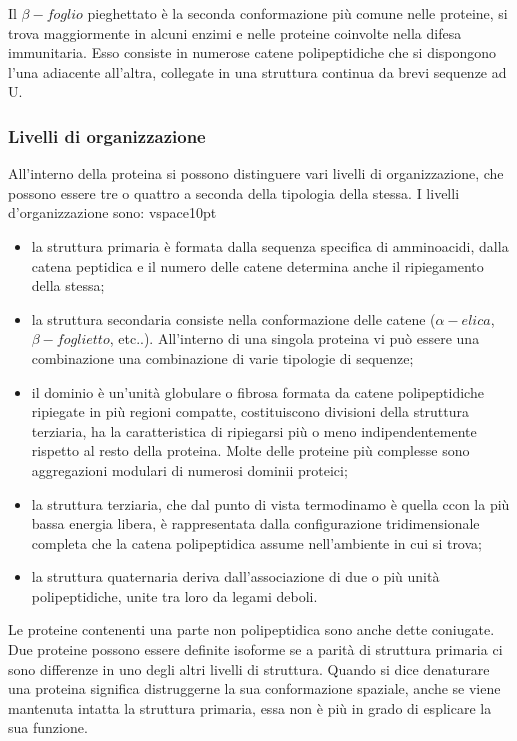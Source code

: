 Il $\beta-foglio$ pieghettato è la seconda conformazione più comune nelle proteine, si trova maggiormente in alcuni enzimi e nelle proteine coinvolte nella difesa 
immunitaria. Esso consiste in numerose catene polipeptidiche che si dispongono l'una adiacente all'altra, collegate in una struttura continua da brevi sequenze ad U.

\subsubsection{Livelli di organizzazione}\label{subsec:es_subsec}
All'interno della proteina si possono distinguere vari livelli di organizzazione, che possono essere tre o quattro a seconda della tipologia della stessa.
I livelli d'organizzazione sono: 
vspace{10pt}
\begin{itemize}
    \item la struttura primaria è formata dalla sequenza specifica di amminoacidi, dalla catena peptidica e il numero delle catene determina anche il ripiegamento
    della stessa;
    \vspace{5pt}
    \item la struttura secondaria consiste nella conformazione delle catene ($\alpha-elica$, $\beta-foglietto$, etc..). All'interno di una singola proteina vi può 
    essere una combinazione una combinazione di varie tipologie di sequenze;
    \vspace{5pt}
    \item il dominio è un'unità globulare o fibrosa formata da catene polipeptidiche ripiegate in più regioni compatte, costituiscono divisioni della struttura 
    terziaria, ha la caratteristica di ripiegarsi più o meno indipendentemente rispetto al resto della proteina. Molte delle proteine più complesse sono 
    aggregazioni modulari di numerosi dominii proteici;
    \vspace{5pt} 
    \item la struttura terziaria, che dal punto di vista termodinamo è quella ccon la più bassa energia libera, è rappresentata dalla configurazione tridimensionale
    completa che la catena polipeptidica assume nell'ambiente in cui si trova;
    \vspace{5pt}
    \item la struttura quaternaria deriva dall'associazione di due o più unità polipeptidiche, unite tra loro da legami deboli.
\end{itemize} 

Le proteine contenenti una parte non polipeptidica sono anche dette coniugate. Due proteine possono essere definite isoforme se a parità di struttura primaria ci sono 
differenze in uno degli altri livelli di struttura. Quando si dice denaturare una proteina significa distruggerne la sua conformazione spaziale, anche se viene 
mantenuta intatta la struttura primaria, essa non è più in grado di esplicare la sua funzione.

